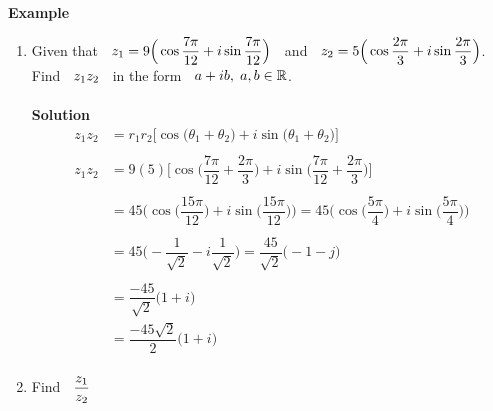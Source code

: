 \documentclass[11pt,a4paper]{article}
\begin{document}
\textbf{Example}
\begin{enumerate}
\item Given that $\hspace{0.2cm} z_1 = 9\Big( \cos \dfrac{7\pi}{12} + i \sin \dfrac{7\pi}{12}\Big)\hspace{0.2cm}$ and $\hspace{0.2cm} z_2 = 5\Big( \cos \dfrac{2\pi}{3} +  i \sin \dfrac{2\pi}{3}\Big)$.\\

Find $\hspace{0.2cm} z_1z_2\hspace{0.2cm}$  in the form $\hspace{0.2cm} a + ib,\hspace{0.1cm} a, b \in \mathbb{R}$.\\\\

\textbf{Solution}
\begin{align*}
z_1z_2 & = r_1r_2\big[\cos \big(\theta_1 + \theta_2\big) + i\sin\big(\theta_1 + \theta_2\big)\big]\\\\
z_1z_2 & = 9(5)\Big[\cos \big(\dfrac{7\pi}{12} + \dfrac{2\pi}{3} \Big) + i\sin\Big(\dfrac{7\pi}{12}+ \dfrac{2\pi}{3} \Big)\Big]\\\\
& = 45 \Bigg( \cos \Big(\dfrac{15\pi}{12}\Big) + i\sin\Big(\dfrac{15\pi}{12}\Big)\Bigg)
 = 45 \Bigg( \cos \Big(\dfrac{5\pi}{4}\Big) + i\sin\Big(\dfrac{5\pi}{4}\Big)\Bigg)\\\\
& = 45\Bigg(-\dfrac{1}{\sqrt{2}} - i\dfrac{1}{\sqrt{2}}\Bigg) = \dfrac{45}{\sqrt{2}}\Big(-1 - j\Big)\\\\
& = \dfrac{-45}{\sqrt{2}}\big( 1 + i\big)\\
& = \dfrac{-45\sqrt{2}}{2}\big(1 + i\big)\\
\end{align*}




\item Find $\hspace{0.2cm} \dfrac{z_1}{z_2}$\\


\end{enumerate}
\end{document}
